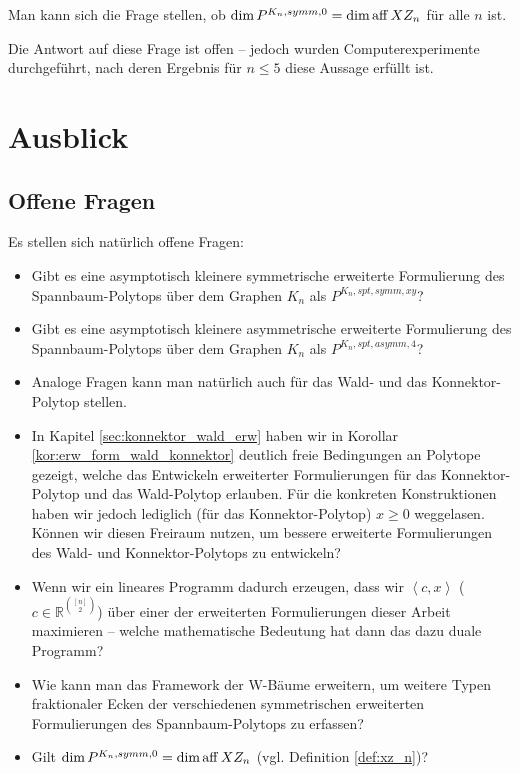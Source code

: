 \documentclass[10p,a4paper,BCOR = 12mm, DIV=15]{scrbook}
\begin{document}
Man kann sich die Frage stellen, ob $\dim P^{K_n, symm, 0} = \dim \operatorname{aff} XZ_n$ für alle $n$ ist.

Die Antwort auf diese Frage ist offen -- jedoch wurden Computerexperimente durchgeführt, nach deren Ergebnis für $n \leq 5$ diese Aussage erfüllt ist.

\part{Ausblick}

\chapter{Offene Fragen}

Es stellen sich natürlich offene Fragen:
\begin{itemize}
\item Gibt es eine asymptotisch kleinere symmetrische erweiterte Formulierung des Spannbaum-Polytops über dem Graphen $K_n$ als $P^{K_n, spt, symm, xy}$?
\item Gibt es eine asymptotisch kleinere asymmetrische erweiterte Formulierung des Spannbaum-Polytops über dem Graphen $K_n$ als $P^{K_n, spt, asymm, 4}$?
\item Analoge Fragen kann man natürlich auch für das Wald- und das Konnektor-Polytop stellen.
\item In Kapitel \ref{sec:konnektor_wald_erw} haben wir in Korollar \ref{kor:erw_form_wald_konnektor} deutlich freie Bedingungen an Polytope gezeigt, welche das Entwickeln erweiterter Formulierungen für das Konnektor-Polytop und das Wald-Polytop erlauben. Für die konkreten Konstruktionen haben wir jedoch lediglich (für das Konnektor-Polytop) $x \geq 0$ weggelasen. Können wir diesen Freiraum nutzen, um bessere erweiterte Formulierungen des Wald- und Konnektor-Polytops zu entwickeln?
\item Wenn wir ein lineares Programm dadurch erzeugen, dass wir $\left\langle c, x\right\rangle$ ($c \in \mathbb{R}^{\left[n\right] \choose 2}$) über einer der erweiterten Formulierungen dieser Arbeit maximieren -- welche mathematische Bedeutung hat dann das dazu duale Programm?
\item Wie kann man das Framework der W-Bäume erweitern, um weitere Typen fraktionaler Ecken der verschiedenen symmetrischen erweiterten Formulierungen des Spannbaum-Polytops zu erfassen?
\item Gilt $\dim P^{K_n, symm, 0} = \dim \operatorname{aff} XZ_n$ (vgl. Definition \ref{def:xz_n})?
\end{itemize}

\appendix

\backmatter


\end{document}
